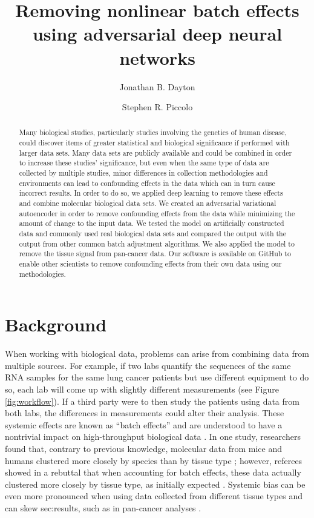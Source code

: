 \documentclass[notitlepage]{article}
\begin{document}
\title{Removing nonlinear batch effects using adversarial deep neural networks}
\author[1]{Jonathan B. Dayton}
\author[1]{Stephen R. Piccolo}
\date{}

\maketitle

\begin{abstract}
	Many biological studies, particularly studies involving the genetics of human disease, could discover items of greater statistical and biological significance if performed with larger data sets.
	Many data sets are publicly available and could be combined in order to increase these studies' significance, but even when the same type of data are collected by multiple studies, minor differences in collection methodologies and environments can lead to confounding effects in the data which can in turn cause incorrect results.
	In order to do so, we applied deep learning to remove these effects and combine molecular biological data sets.
	We created an adversarial variational autoencoder in order to remove confounding effects from the data while minimizing the amount of change to the input data.
	We tested the model on artificially constructed data and commonly used real biological data sets and compared the output with the output from other common batch adjustment algorithms.
	We also applied the model to remove the tissue signal from pan-cancer data.
	Our software is available on GitHub to enable other scientists to remove confounding effects from their own data using our methodologies.
\end{abstract}

\section{Background} \label{sec:background}

When working with biological data, problems can arise from combining data from multiple sources.
For example, if two labs quantify the sequences of the same RNA samples for the same lung cancer patients but use different equipment to do so, each lab will come up with slightly different measurements (see Figure \ref{fig:workflow}).
If a third party were to then study the patients using data from both labs, the differences in measurements could alter their analysis.
These systemic effects are known as ``batch effects'' and are understood to have a nontrivial impact on high-throughput biological data \citep{leek_tackling_2010}.
In one study, researchers found that, contrary to previous knowledge, molecular data from mice and humans clustered more closely by species than by tissue type \citep{yue_comparative_2014};
however, referees showed in a rebuttal that when accounting for batch effects, these data actually clustered more closely by tissue type, as initially expected \citep{gilad_reanalysis_2015}.
Systemic bias can be even more pronounced when using data collected from different tissue types and can skew sec:results, such as in pan-cancer analyses \citep{dayton_classifying_2017-1}.
\end{document}
